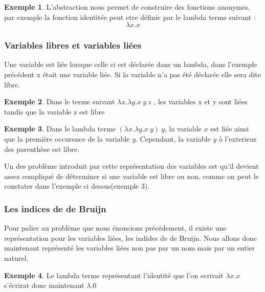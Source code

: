 \documentclass {article}
\theoremstyle{definition}
\newtheorem{example}{Exemple}
\theoremstyle{remark}
\begin{document}
\begin{example}
  L'abstraction nous permet de construire des fonctions anonymes, par exemple la
  fonction identitée peut etre définie par le lambda terme suivant :
  \[ 
  \lambda x. x
  \]
\end{example}

\subsubsection{Variables libres et variables liées}

Une variable est liée lorsque celle ci est déclarée dans un lambda, dans 
l'exemple précédent x était une variable liée. 
Si la variable n'a pas été déclarée elle sera dite libre. 

\begin{example}
  Dans le terme suivant \(\lambda x.\lambda y.x\:y\:z\) , les variables x et 
  y sont liées tandis que la variable z est libre 
\end{example}

\begin{example}
  Dans le lambda terme \((\lambda x. \lambda y. x\: y)\: y\), la
  variable \(x\) est liée ainsi que la première occurence de la
  variable \(y\). Cependant, la variable \(y\) à l'exterieur des
  parenthèse est libre.
\end{example}

Un des problème introduit par cette représentation des variables est qu'il devient assez compliqué de déterminer si une variable est libre ou non, comme on peut le constater dans l'exemple ci dessus(exemple 3). 

\subsubsection{Les indices de de Bruijn}

Pour palier au problème que nous énoncions précédement, il existe une 
représentation pour les variables liées, les indides de de Bruijn.
Nous allons donc maintenant représenté les variables liées non pas par un 
nom mais par un entier naturel. 
\begin{example}
  Le lambda terme représentant l'identité que l'on ecrivait \(\lambda x.x\) s'écrirat donc maintenant \(\lambda.0\)
\end{example}

  
\end{document}
